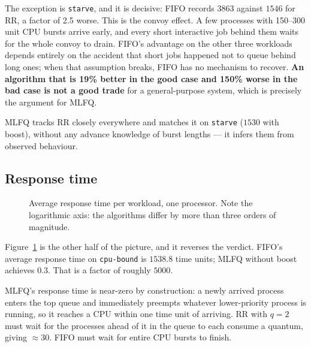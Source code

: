\documentclass[11pt,a4paper]{article}
\begin{document}
The exception is \texttt{starve}, and it is decisive: FIFO records $3863$
against $1546$ for RR, a factor of 2.5 worse. This is the convoy effect. A few
processes with 150--300 unit CPU bursts arrive early, and every short
interactive job behind them waits for the whole convoy to drain. FIFO's
advantage on the other three workloads depends entirely on the accident that
short jobs happened not to queue behind long ones; when that assumption breaks,
FIFO has no mechanism to recover. \textbf{An algorithm that is 19\% better in
the good case and 150\% worse in the bad case is not a good trade} for a
general-purpose system, which is precisely the argument for MLFQ.

MLFQ tracks RR closely everywhere and matches it on \texttt{starve}
($1530$ with boost), without any advance knowledge of burst lengths --- it
infers them from observed behaviour.

\subsection{Response time}
\label{sec:resp}

\begin{figure}[h]
\centering
{}
\caption{Average response time per workload, one processor. Note the
logarithmic axis: the algorithms differ by more than three orders of
magnitude.}
\label{fig:resp1}
\end{figure}

Figure~\ref{fig:resp1} is the other half of the picture, and it reverses the
verdict. FIFO's average response time on \texttt{cpu-bound} is $1538.8$ time
units; MLFQ without boost achieves $0.3$. That is a factor of roughly $5000$.

MLFQ's response time is near-zero by construction: a newly arrived process
enters the top queue and immediately preempts whatever lower-priority process
is running, so it reaches a CPU within one time unit of arriving. RR with
$q{=}2$ must wait for the processes ahead of it in the queue to each consume a
quantum, giving $\approx 30$. FIFO must wait for entire CPU bursts to finish.
\end{document}
